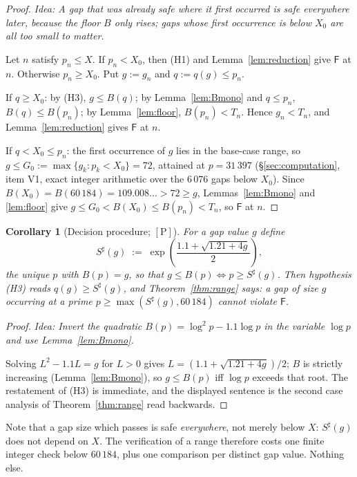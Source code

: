 \documentclass[11pt,a4paper]{article}
\theoremstyle{plain}
\newtheorem{corollary}[theorem]{Corollary}
\theoremstyle{definition}
\theoremstyle{remark}
\newcommand{\idea}[1]{\emph{Idea: #1}\par\smallskip}
\newcommand{\cP}{{[\mathrm{P}]}}
\newcommand{\Fb}{\mathsf{F}}
\begin{document}
\begin{proof}
\idea{A gap that was already safe where it \emph{first} occurred is safe everywhere later,
because the floor $B$ only rises; gaps whose first occurrence is below $X_0$ are all too
small to matter.}
Let $n$ satisfy $p_n \le X$. If $p_n < X_0$, then (H1) and Lemma~\ref{lem:reduction} give
$\Fb$ at $n$. Otherwise $p_n \ge X_0$. Put $g := g_n$ and $q := q(g) \le p_n$.

If $q \ge X_0$: by (H3), $g \le B(q)$; by Lemma~\ref{lem:Bmono} and $q \le p_n$,
$B(q) \le B(p_n)$; by Lemma~\ref{lem:floor}, $B(p_n) < T_n$. Hence $g_n < T_n$, and
Lemma~\ref{lem:reduction} gives $\Fb$ at $n$.

If $q < X_0 \le p_n$: the first occurrence of $g$ lies in the base-case range, so
$g \le G_0 := \max\{g_k : p_k < X_0\} = 72$, attained at $p = 31\,397$
(\S\ref{sec:computation}, item V1, exact integer arithmetic over the $6\,076$ gaps
below $X_0$). Since $B(X_0) = B(60\,184) = 109.008\ldots > 72 \ge g$, Lemmas~\ref{lem:Bmono}
and \ref{lem:floor} give $g \le G_0 < B(X_0) \le B(p_n) < T_n$, so $\Fb$ at $n$.
\end{proof}

\begin{corollary}[Decision procedure; $\cP$]
\label{cor:S}
For a gap value $g$ define
\[
S^\sharp(g) \;:=\; \exp\!\left(\frac{1.1 + \sqrt{1.21 + 4g}}{2}\right),
\]
the unique $p$ with $B(p) = g$, so that $g \le B(p) \iff p \ge S^\sharp(g)$. Then
hypothesis \textup{(H3)} reads $q(g) \ge S^\sharp(g)$, and Theorem~\ref{thm:range} says:
\emph{a gap of size $g$ occurring at a prime $p \ge \max(S^\sharp(g), 60\,184)$ cannot
violate $\Fb$.}
\end{corollary}

\begin{proof}
\idea{Invert the quadratic $B(p) = \log^2 p - 1.1\log p$ in the variable $\log p$ and use
Lemma~\ref{lem:Bmono}.}
Solving $L^2 - 1.1L = g$ for $L > 0$ gives $L = (1.1 + \sqrt{1.21+4g})/2$; $B$ is strictly
increasing (Lemma~\ref{lem:Bmono}), so $g \le B(p)$ iff $\log p$ exceeds that root. The
restatement of (H3) is immediate, and the displayed sentence is the second case analysis of
Theorem~\ref{thm:range} read backwards.
\end{proof}

Note that a gap size which passes is safe \emph{everywhere}, not merely below $X$:
$S^\sharp(g)$ does not depend on $X$. The verification of a range therefore costs one finite
integer check below $60\,184$, plus one comparison per distinct gap value. Nothing else.
\end{document}
